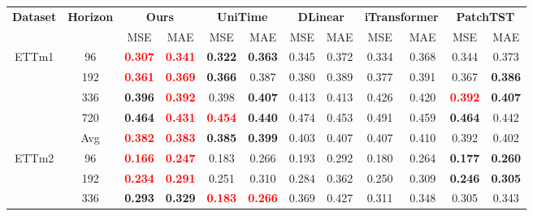 
\begin{table}[!htbp]
\centering
\small
\setlength{\tabcolsep}{3.6pt}
\renewcommand{\arraystretch}{0.96}
\label{tab:chap5-main-results-b}
\begin{tabular}{c|c|cc|cc|cc|cc|cc}
\toprule
\multirow{2}{*}{\textbf{Dataset}} & \multirow{2}{*}{\textbf{Horizon}} &
\multicolumn{2}{c|}{\textbf{Ours}} &
\multicolumn{2}{c|}{\textbf{UniTime}} &
\multicolumn{2}{c|}{\textbf{DLinear}} &
\multicolumn{2}{c|}{\textbf{iTransformer}} &
\multicolumn{2}{c}{\textbf{PatchTST}} \\
& & MSE & MAE & MSE & MAE & MSE & MAE & MSE & MAE & MSE & MAE \\
\midrule
\multirow{5}{*}{ETTm1}
& 96 & \textbf{\textcolor{red}{0.307}} & \textbf{\textcolor{red}{0.341}} & \textbf{0.322} & \textbf{0.363} & 0.345 & 0.372 & 0.334 & 0.368 & 0.344 & 0.373 \\
& 192 & \textbf{\textcolor{red}{0.361}} & \textbf{\textcolor{red}{0.369}} & \textbf{0.366} & 0.387 & 0.380 & 0.389 & 0.377 & 0.391 & 0.367 & \textbf{0.386} \\
& 336 & \textbf{0.396} & \textbf{\textcolor{red}{0.392}} & 0.398 & \textbf{0.407} & 0.413 & 0.413 & 0.426 & 0.420 & \textbf{\textcolor{red}{0.392}} & \textbf{0.407} \\
& 720 & \textbf{0.464} & \textbf{\textcolor{red}{0.431}} & \textbf{\textcolor{red}{0.454}} & \textbf{0.440} & 0.474 & 0.453 & 0.491 & 0.459 & \textbf{0.464} & 0.442 \\
& Avg & \textbf{\textcolor{red}{0.382}} & \textbf{\textcolor{red}{0.383}} & \textbf{0.385} & \textbf{0.399} & 0.403 & 0.407 & 0.407 & 0.410 & 0.392 & 0.402 \\
\midrule
\multirow{5}{*}{ETTm2}
& 96 & \textbf{\textcolor{red}{0.166}} & \textbf{\textcolor{red}{0.247}} & 0.183 & 0.266 & 0.193 & 0.292 & 0.180 & 0.264 & \textbf{0.177} & \textbf{0.260} \\
& 192 & \textbf{\textcolor{red}{0.234}} & \textbf{\textcolor{red}{0.291}} & 0.251 & 0.310 & 0.284 & 0.362 & 0.250 & 0.309 & \textbf{0.246} & \textbf{0.305} \\
& 336 & \textbf{0.293} & \textbf{0.329} & \textbf{\textcolor{red}{0.183}} & \textbf{\textcolor{red}{0.266}} & 0.369 & 0.427 & 0.311 & 0.348 & 0.305 & 0.343 \\

\end{tabular}
\end{table}

